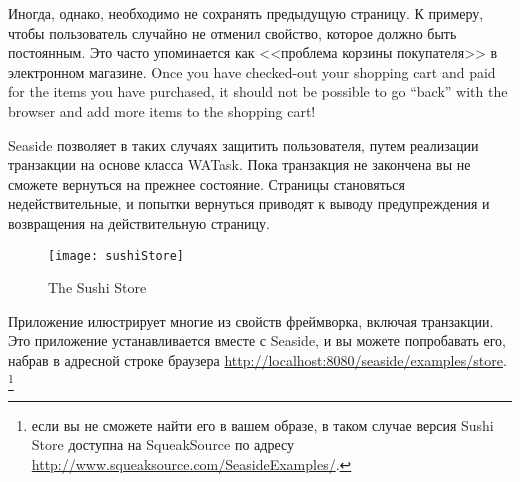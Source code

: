 \documentclass[a4paper,10pt,twoside]{book}
\begin{document}
Иногда, однако, необходимо не сохранять предыдущую страницу.
К примеру, чтобы пользователь случайно не отменил свойство,
которое должно быть постоянным.
Это часто упоминается как <<проблема корзины покупателя>>
в электронном магазине.
Once you have checked-out your shopping cart and paid for the items you have purchased,
it should not be possible to go ``back'' with the browser and add more items to the
shopping cart!


Seaside позволяет в таких случаях защитить пользователя,
путем реализации транзакции на основе класса WATask.
Пока транзакция не закончена вы не сможете вернуться на прежнее состояние.
Страницы становяться недействительные, и попытки
вернуться приводят к выводу предупреждения и возвращения
на действительную страницу.

\begin{figure}[ht]
\begin{center}
\texttt{[image: sushiStore]}
\caption{The Sushi Store}
\end{center}
\end{figure}


Приложение  илюстрирует многие из свойств
фреймворка, включая транзакции.
Это приложение устанавливается вместе с Seaside, и вы можете попробавать
его, набрав в адресной строке браузера
\url{http://localhost:8080/seaside/examples/store}.
\footnote{если вы не сможете найти его в вашем образе, в таком случае
версия Sushi Store доступна на SqueakSource по адресу
\url{http://www.squeaksource.com/SeasideExamples/}.}
\end{document}
